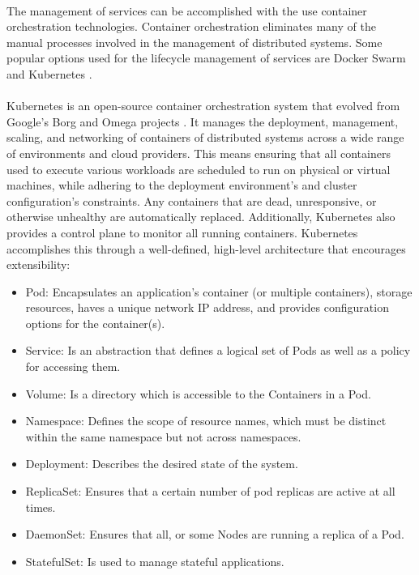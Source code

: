 \paragraph{}

The management of services can be accomplished with the use container orchestration technologies.
Container orchestration eliminates many of the manual processes involved in the management of distributed systems.
Some popular options used for the lifecycle management of services are Docker Swarm \cite{docker2016swarm} and Kubernetes \cite{kubernetes}.

\paragraph{}

Kubernetes \cite{kubernetes} is an open-source container orchestration system that evolved from Google's Borg and Omega projects \cite{burns2016borg}.
It manages the deployment, management, scaling, and networking of containers of distributed systems across a wide range of environments
and cloud providers.
This means ensuring that all containers used to execute various workloads are scheduled to run on physical or virtual machines,
while adhering to the deployment environment's and cluster configuration's constraints.
Any containers that are dead, unresponsive, or otherwise unhealthy are automatically replaced.
Additionally, Kubernetes also provides a control plane to monitor all running containers.
Kubernetes accomplishes this through a well-defined, high-level architecture that encourages extensibility:

\begin{itemize}
    \item Pod: Encapsulates an application's container (or multiple containers),
    storage resources, haves a unique network IP address, and provides configuration options for the container(s).
    \item Service: Is an abstraction that defines a logical set of Pods as well as a policy for accessing them.
    \item Volume: Is a directory which is accessible to the
    Containers in a Pod.
    \item Namespace: Defines the scope of resource names, which must be distinct within the same namespace but not across namespaces.
    \item Deployment: Describes the desired state of the system.
    \item ReplicaSet: Ensures that a certain number of pod replicas are active at all times.
    \item DaemonSet: Ensures that all, or some Nodes are running a replica of a Pod.
    \item StatefulSet: Is used to manage stateful applications.
\end{itemize}

